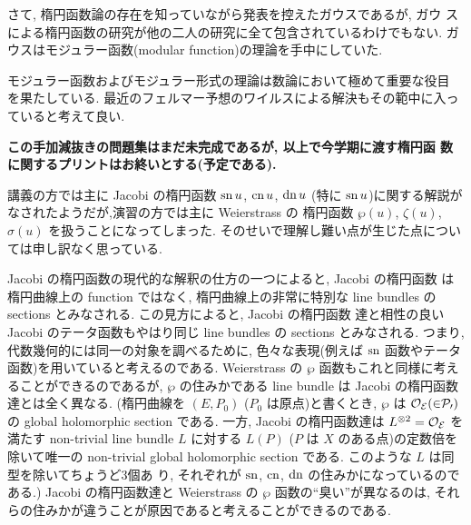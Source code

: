 \documentclass[12pt,twoside]{jarticle}
\def\O{\cal{O}}
\def\pe{\wp}
\def\sn{\mathop{\text{\rm sn}}\nolimits}
\def\cn{\mathop{\text{\rm cn}}\nolimits}
\def\dn{\mathop{\text{\rm dn}}\nolimits}
\begin{document}
さて, 楕円函数論の存在を知っていながら発表を控えたガウスであるが, ガウ
スによる楕円函数の研究が他の二人の研究に全て包含されているわけでもない. 
ガウスはモジュラー函数(modular function)の理論を手中にしていた. 

モジュラー函数およびモジュラー形式の理論は数論において極めて重要な役目
を果たしている. 最近のフェルマー予想のワイルスによる解決もその範中に入っ
ていると考えて良い.

\bigskip\bigskip\bigskip 

{\Large\bf %
  この手加減抜きの問題集はまだ未完成であるが, 以上で今学期に渡す楕円函
  数に関するプリントはお終いとする(予定である).
}
\medskip

講義の方では主に Jacobi の楕円函数 $\sn u$, $\cn u$, $\dn u$ (特に %
$\sn u$)に関する解説がなされたようだが,演習の方では主に Weierstrass の
楕円函数 $\pe(u)$, $\zeta(u)$, $\sigma(u)$ を扱うことになってしまった.
そのせいで理解し難い点が生じた点については申し訳なく思っている.

Jacobi の楕円函数の現代的な解釈の仕方の一つによると, Jacobi の楕円函数
は楕円曲線上の function ではなく, 楕円曲線上の非常に特別な line
bundles の sections とみなされる. この見方によると, Jacobi の楕円函数
達と相性の良い Jacobi のテータ函数もやはり同じ line bundles の 
sections とみなされる. つまり, 代数幾何的には同一の対象を調べるために,
色々な表現(例えば $\sn$ 函数やテータ函数)を用いていると考えるのである.
Weierstrass の $\pe$ 函数もこれと同様に考えることができるのであるが, 
$\pe$ の住みかである line bundle は Jacobi の楕円函数達とは全く異なる.
(楕円曲線を $(E,P_0)$ ($P_0$ は原点)と書くとき, $\pe$ は $\O_E(2P_0)$ 
の global holomorphic section である. 一方, Jacobi の楕円函数達は %
$L^{\otimes2}=\O_E$ を満たす non-trivial line bundle $L$ に対する %
$L(P)$ ($P$ は $X$ のある点)の定数倍を除いて唯一の non-trivial global
holomorphic section である. このような $L$ は同型を除いてちょうど3個あ
り, それぞれが $\sn$, $\cn$, $\dn$ の住みかになっているのである.)
Jacobi の楕円函数達と Weierstrass の $\pe$ 函数の``臭い''が異なるのは, 
それらの住みかが違うことが原因であると考えることができるのである.

\end{document}
